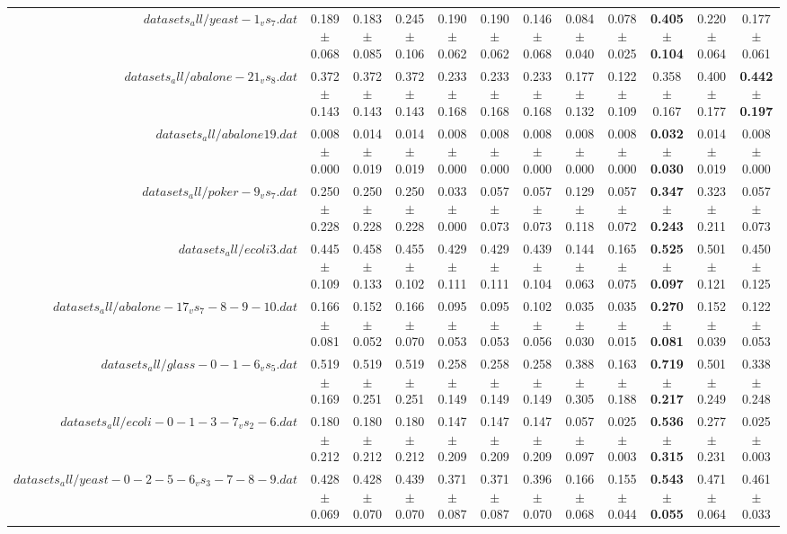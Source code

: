 \begin{table}[!ht]
{\begin{tabular}{r c c c c c c c c c c c}
$datasets_all/yeast-1_vs_7.dat$ & 0.189 $\pm$ 0.068 & 0.183 $\pm$ 0.085 & 0.245 $\pm$ 0.106 & 0.190 $\pm$ 0.062 & 0.190 $\pm$ 0.062 & 0.146 $\pm$ 0.068 & 0.084 $\pm$ 0.040 & 0.078 $\pm$ 0.025 & \textbf{0.405 $\pm$ 0.104} & 0.220 $\pm$ 0.064 & 0.177 $\pm$ 0.061 \\
$datasets_all/abalone-21_vs_8.dat$ & 0.372 $\pm$ 0.143 & 0.372 $\pm$ 0.143 & 0.372 $\pm$ 0.143 & 0.233 $\pm$ 0.168 & 0.233 $\pm$ 0.168 & 0.233 $\pm$ 0.168 & 0.177 $\pm$ 0.132 & 0.122 $\pm$ 0.109 & 0.358 $\pm$ 0.167 & 0.400 $\pm$ 0.177 & \textbf{0.442 $\pm$ 0.197} \\
$datasets_all/abalone19.dat$ & 0.008 $\pm$ 0.000 & 0.014 $\pm$ 0.019 & 0.014 $\pm$ 0.019 & 0.008 $\pm$ 0.000 & 0.008 $\pm$ 0.000 & 0.008 $\pm$ 0.000 & 0.008 $\pm$ 0.000 & 0.008 $\pm$ 0.000 & \textbf{0.032 $\pm$ 0.030} & 0.014 $\pm$ 0.019 & 0.008 $\pm$ 0.000 \\
$datasets_all/poker-9_vs_7.dat$ & 0.250 $\pm$ 0.228 & 0.250 $\pm$ 0.228 & 0.250 $\pm$ 0.228 & 0.033 $\pm$ 0.000 & 0.057 $\pm$ 0.073 & 0.057 $\pm$ 0.073 & 0.129 $\pm$ 0.118 & 0.057 $\pm$ 0.072 & \textbf{0.347 $\pm$ 0.243} & 0.323 $\pm$ 0.211 & 0.057 $\pm$ 0.073 \\
$datasets_all/ecoli3.dat$ & 0.445 $\pm$ 0.109 & 0.458 $\pm$ 0.133 & 0.455 $\pm$ 0.102 & 0.429 $\pm$ 0.111 & 0.429 $\pm$ 0.111 & 0.439 $\pm$ 0.104 & 0.144 $\pm$ 0.063 & 0.165 $\pm$ 0.075 & \textbf{0.525 $\pm$ 0.097} & 0.501 $\pm$ 0.121 & 0.450 $\pm$ 0.125 \\
$datasets_all/abalone-17_vs_7-8-9-10.dat$ & 0.166 $\pm$ 0.081 & 0.152 $\pm$ 0.052 & 0.166 $\pm$ 0.070 & 0.095 $\pm$ 0.053 & 0.095 $\pm$ 0.053 & 0.102 $\pm$ 0.056 & 0.035 $\pm$ 0.030 & 0.035 $\pm$ 0.015 & \textbf{0.270 $\pm$ 0.081} & 0.152 $\pm$ 0.039 & 0.122 $\pm$ 0.053 \\
$datasets_all/glass-0-1-6_vs_5.dat$ & 0.519 $\pm$ 0.169 & 0.519 $\pm$ 0.251 & 0.519 $\pm$ 0.251 & 0.258 $\pm$ 0.149 & 0.258 $\pm$ 0.149 & 0.258 $\pm$ 0.149 & 0.388 $\pm$ 0.305 & 0.163 $\pm$ 0.188 & \textbf{0.719 $\pm$ 0.217} & 0.501 $\pm$ 0.249 & 0.338 $\pm$ 0.248 \\
$datasets_all/ecoli-0-1-3-7_vs_2-6.dat$ & 0.180 $\pm$ 0.212 & 0.180 $\pm$ 0.212 & 0.180 $\pm$ 0.212 & 0.147 $\pm$ 0.209 & 0.147 $\pm$ 0.209 & 0.147 $\pm$ 0.209 & 0.057 $\pm$ 0.097 & 0.025 $\pm$ 0.003 & \textbf{0.536 $\pm$ 0.315} & 0.277 $\pm$ 0.231 & 0.025 $\pm$ 0.003 \\
$datasets_all/yeast-0-2-5-6_vs_3-7-8-9.dat$ & 0.428 $\pm$ 0.069 & 0.428 $\pm$ 0.070 & 0.439 $\pm$ 0.070 & 0.371 $\pm$ 0.087 & 0.371 $\pm$ 0.087 & 0.396 $\pm$ 0.070 & 0.166 $\pm$ 0.068 & 0.155 $\pm$ 0.044 & \textbf{0.543 $\pm$ 0.055} & 0.471 $\pm$ 0.064 & 0.461 $\pm$ 0.033 \\

\end{tabular}}
\end{table}
